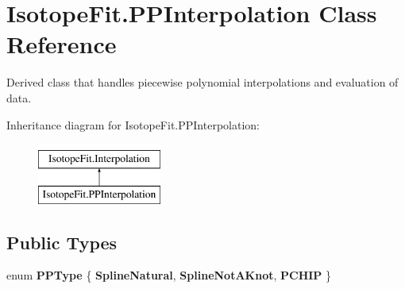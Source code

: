 \hypertarget{class_isotope_fit_1_1_p_p_interpolation}{}\section{Isotope\+Fit.\+P\+P\+Interpolation Class Reference}
\label{class_isotope_fit_1_1_p_p_interpolation}


Derived class that handles piecewise polynomial interpolations and evaluation of data.  


Inheritance diagram for Isotope\+Fit.\+P\+P\+Interpolation\+:\begin{figure}[H]
\begin{center}
\leavevmode
\includegraphics[height=2.000000cm]{class_isotope_fit_1_1_p_p_interpolation}
\end{center}
\end{figure}
\subsection*{Public Types}
\begin{DoxyCompactItemize}
\item 
\mbox{\label{class_isotope_fit_1_1_p_p_interpolation_ab16ae4c5036a290c4db168e75973ff1e}} 
enum {\bfseries P\+P\+Type} \{ {\bfseries Spline\+Natural}, 
{\bfseries Spline\+Not\+A\+Knot}, 
{\bfseries P\+C\+H\+IP}
 \}
\end{DoxyCompactItemize}
